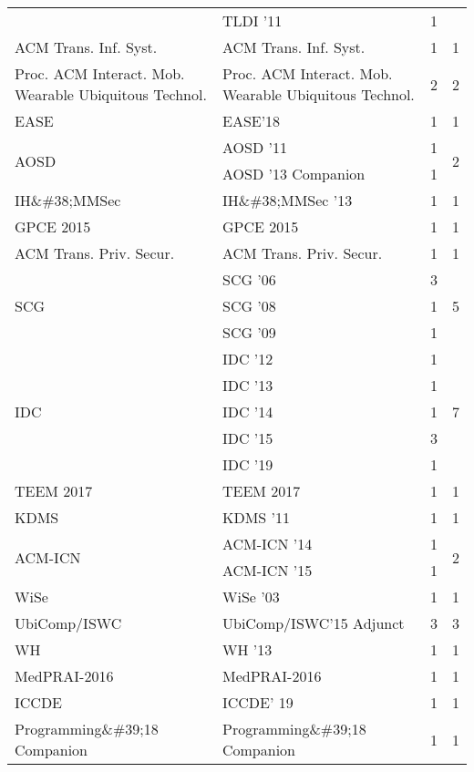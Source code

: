 \begin{table*}[t]
\begin{tabular}{llrr}
& TLDI '11 & 1 &\\
\multirow{1}{*}{ACM Trans. Inf. Syst.} & ACM Trans. Inf. Syst. & 1 & \multirow{1}{*}{1}\\
\multirow{1}{*}{Proc. ACM Interact. Mob. Wearable Ubiquitous Technol.} & Proc. ACM Interact. Mob. Wearable Ubiquitous Technol. & 2 & \multirow{1}{*}{2}\\
\multirow{1}{*}{EASE} & EASE'18 & 1 & \multirow{1}{*}{1}\\
\multirow{2}{*}{AOSD } & AOSD '11 & 1 & \multirow{2}{*}{2}\\
& AOSD '13 Companion & 1 &\\
\multirow{1}{*}{IH\&\#38;MMSec } & IH\&\#38;MMSec '13 & 1 & \multirow{1}{*}{1}\\
\multirow{1}{*}{GPCE 2015} & GPCE 2015 & 1 & \multirow{1}{*}{1}\\
\multirow{1}{*}{ACM Trans. Priv. Secur.} & ACM Trans. Priv. Secur. & 1 & \multirow{1}{*}{1}\\
\multirow{3}{*}{SCG } & SCG '06 & 3 & \multirow{3}{*}{5}\\
& SCG '08 & 1 &\\
& SCG '09 & 1 &\\
\multirow{5}{*}{IDC } & IDC '12 & 1 & \multirow{5}{*}{7}\\
& IDC '13 & 1 &\\
& IDC '14 & 1 &\\
& IDC '15 & 3 &\\
& IDC '19 & 1 &\\
\multirow{1}{*}{TEEM 2017} & TEEM 2017 & 1 & \multirow{1}{*}{1}\\
\multirow{1}{*}{KDMS } & KDMS '11 & 1 & \multirow{1}{*}{1}\\
\multirow{2}{*}{ACM-ICN } & ACM-ICN '14 & 1 & \multirow{2}{*}{2}\\
& ACM-ICN '15 & 1 &\\
\multirow{1}{*}{WiSe } & WiSe '03 & 1 & \multirow{1}{*}{1}\\
\multirow{1}{*}{UbiComp/ISWC} & UbiComp/ISWC'15 Adjunct & 3 & \multirow{1}{*}{3}\\
\multirow{1}{*}{WH } & WH '13 & 1 & \multirow{1}{*}{1}\\
\multirow{1}{*}{MedPRAI-2016} & MedPRAI-2016 & 1 & \multirow{1}{*}{1}\\
\multirow{1}{*}{ICCDE} & ICCDE' 19 & 1 & \multirow{1}{*}{1}\\
\multirow{1}{*}{Programming\&\#39;18 Companion} & Programming\&\#39;18 Companion & 1 & \multirow{1}{*}{1}\\

\end{tabular}
\end{table*}
